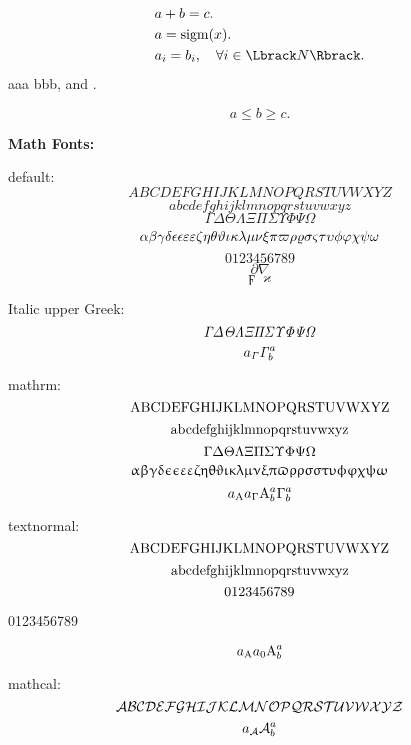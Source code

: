 \documentclass{article}
\begin{document}
\begin{align}
  & a + b = c. \\
  & a = \sigm(x).
  \label{eqn:a} \\
  & a_i = b_i, \quad \forall i \in \lrbbrack{N}.
  \label{eqn:b}
\end{align}
aaa  bbb, and . \ie{} \eg{} \etc{} \etal

\[
  a \le b \ge c.
\]

\textbf{Math Fonts:}

default:
\[ A B C D E F G H I J K L M N O P Q R S T U V W X Y Z \]
\[ a b c d e f g h i j k l m n o p q r s t u v w x y z \]
\[ \Gamma \Delta \Theta \Lambda \Xi \Pi \Sigma \Upsilon \Phi \Psi \Omega \]
\[ \alpha \beta \gamma \delta \epsilon \eps \varepsilon \veps \zeta \eta \theta \vartheta \iota \kappa \lambda \mu \nu \xi \pi \varpi \rho \varrho \sigma \varsigma \tau \upsilon \phi \varphi \chi \psi \omega \]
\[0123456789\]
\[ \partial \nabla \]
\[ \digamma \varkappa \]

Italic upper Greek:
\[ \itGamma \itDelta \itTheta \itLambda \itXi \itPi \itSigma \itUpsilon \itPhi \itPsi \itOmega \]
\[ a_\itGamma \itGamma^a_b \]

mathrm:
\[ \rmA \rmB \rmC \rmD \rmE \rmF \rmG \rmH \rmI \rmJ \rmK \rmL \rmM \rmN \rmO \rmP \rmQ \rmR \rmS \rmT \rmU \rmV \rmW \rmX \rmY \rmZ \]
\[ \rmaa \rmbb \rmcc \rmdd \rmee \rmff \rmgg \rmhh \rmii \rmjj \rmkk \rmll \rmmm \rmnn \rmoo \rmpp \rmqq \rmrr \rmss \rmtt \rmuu \rmvv \rmww \rmxx \rmyy \rmzz \]
\[ \rmGamma \rmDelta \rmTheta \rmLambda \rmXi \rmPi \rmSigma \rmUpsilon \rmPhi \rmPsi \rmOmega \]
\[ \rmalpha \rmbeta \rmgamma \rmdelta \rmepsilon \rmeps \rmvarepsilon \rmveps \rmzeta \rmeta \rmtheta \rmvartheta \rmiota \rmkappa \rmlambda \rmmu \rmnu \rmxi \rmpi \rmvarpi \rmrho \rmvarrho \rmsigma \rmvarsigma \rmtau \rmupsilon \rmphi \rmvarphi \rmchi \rmpsi \rmomega \]
\[ a_\rmA a_\rmGamma \rmA^a_b \rmGamma^a_b \]

textnormal:
\[ \tnA \tnB \tnC \tnD \tnE \tnF \tnG \tnH \tnI \tnJ \tnK \tnL \tnM \tnN \tnO \tnP \tnQ \tnR \tnS \tnT \tnU \tnV \tnW \tnX \tnY \tnZ \]
\[ \tnaa \tnbb \tncc \tndd \tnee \tnff \tngg \tnhh \tnii \tnjj \tnkk \tnll \tnmm \tnnn \tnoo \tnpp \tnqq \tnrr \tnss \tntt \tnuu \tnvv \tnww \tnxx \tnyy \tnzz \]
\[ \tnzro \tnone \tntwo \tnthr \tnfor \tnfiv \tnsix \tnsev \tneit \tnnin \]
\begin{center}
  0123456789
\end{center}
\[ a_\tnA a_\tnzro \tnA^a_b \]

mathcal:
\[ \clA \clB \clC \clD \clE \clF \clG \clH \clI \clJ \clK \clL \clM \clN \clO \clP \clQ \clR \clS \clT \clU \clV \clW \clX \clY \clZ \]
\[ a_\clA \clA^a_b \]
\end{document}
